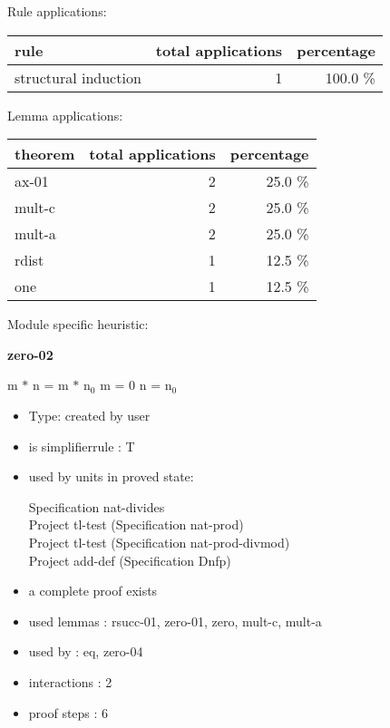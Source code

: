 \documentclass[a4paper]{article}
\begin{document}
Rule applications:

\begin{supertabular}{l|r|r}
rule	        & total applications & percentage \\ \hline
structural induction & 1 & 100.0 \% \\

\end{supertabular}

Lemma applications:

\begin{supertabular}{l|r|r}
theorem	        & total applications & percentage \\ \hline
ax-01 & 2 & 25.0 \% \\
mult-c & 2 & 25.0 \% \\
mult-a & 2 & 25.0 \% \\
rdist & 1 & 12.5 \% \\
one & 1 & 12.5 \% \\

\end{supertabular}

Module specific heuristic:

\pagebreak

{\LARGE\bf zero-02}\label{lemma-zero-02}

\medskip

 \Fol m $*$ n = m $*$ $\mbox{n}_{0}$ \Equiv m = 0 \Or n = $\mbox{n}_{0}$

\begin{itemize}

\item Type: created by user

\item is simplifierrule : T
\item used by units in proved state:

Specification nat-divides \\
Project tl-test (Specification nat-prod) \\
Project tl-test (Specification nat-prod-divmod) \\
Project add-def (Specification Dnfp)
\item       a complete proof exists
\item       used lemmas  : rsucc-01, zero-01, zero, mult-c, mult-a
\item       used by      : eq, zero-04
\item       interactions : 2
\item       proof steps  : 6
\end{itemize}
\end{document}
